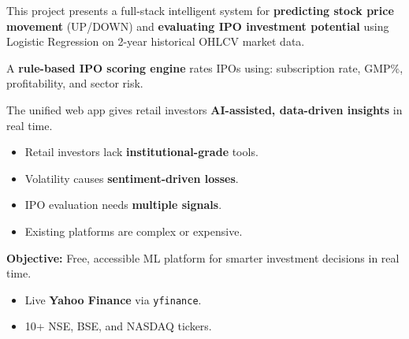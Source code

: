 \documentclass{article}
\newcommand{\bodyfont}{\fontsize{20}{24}\selectfont}
\begin{document}
\begin{minipage}[t]{0.305\linewidth}
\begin{tcolorbox}[sbox, title={[1] Abstract}]
\bodyfont
This project presents a full-stack intelligent system for
\textbf{predicting stock price movement} (UP/DOWN) and
\textbf{evaluating IPO investment potential} using Logistic
Regression on 2-year historical OHLCV market data.
\vspace{5pt}

A \textbf{rule-based IPO scoring engine} rates IPOs using:
subscription rate, GMP\%, profitability, and sector risk.
\vspace{5pt}

\begin{tcolorbox}[hbox]
\bodyfont
The unified web app gives retail investors
\textbf{AI-assisted, data-driven insights} in real time.
\end{tcolorbox}
\end{tcolorbox}

\vspace{8pt}

\begin{tcolorbox}[sbox, title={[2] Introduction \& Motivation}]
\bodyfont
\begin{itemize}[noitemsep,topsep=3pt,leftmargin=1.4em]
  \item Retail investors lack \textbf{institutional-grade} tools.
  \item Volatility causes \textbf{sentiment-driven losses}.
  \item IPO evaluation needs \textbf{multiple signals}.
  \item Existing platforms are complex or expensive.
\end{itemize}
\vspace{5pt}
\begin{tcolorbox}[hbox]
\bodyfont\textbf{Objective:} Free, accessible ML platform for
smarter investment decisions in real time.
\end{tcolorbox}
\vspace{5pt}
\begin{itemize}[noitemsep,topsep=3pt,leftmargin=1.4em]
  \item Live \textbf{Yahoo Finance} via \texttt{yfinance}.
  \item 10+ NSE, BSE, and NASDAQ tickers.
\end{itemize}
\end{tcolorbox}

\vspace{8pt}


\end{minipage}
\end{document}
